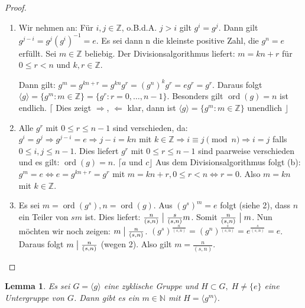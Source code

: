 \documentclass[12pt]{scrartcl} %
\DeclareMathOperator{\ord}{ord}
\newcommand{\divides}{\mathrel{\bigm|}}
\newtheorem{lemma}[thm]{Lemma}
\theoremstyle{definition}
\theoremstyle{remark}
\begin{document}
\begin{proof} %
	\begin{enumerate}
		\item Wir nehmen an: Für $i,j \in \mathbb{Z}$, o.B.d.A. $j>i$ gilt $g^{i}=g^{j}$.
		Dann gilt $g^{j-i}=g^{j}(g^{i})^{-1}=e$.
		Es sei dann n die kleinste positive Zahl, die $g^{n}=e$ erfüllt.
		Sei $m \in \mathbb{Z}$ beliebig.
		Der Divisionsalgorithmus liefert: $m=kn+r$ für $0 \leq r < n$ und $k,r \in \mathbb{Z}$.

		Dann gilt:
		$g^{m}=g^{kn+r}=g^{kn}g^{r}=(g^{n})^{k}g^{r}=eg^{r}=g^{r}$.
		Daraus folgt $\langle g \rangle = \lbrace g^{m} : m \in \mathbb{Z}\rbrace = \lbrace g^{r} : r=0,\dots,n-1\rbrace$.
		Besonders gilt $\ord(g)=n$ ist endlich.
		$\lceil$ Dies zeigt $\Rightarrow$, $\Leftarrow$ klar, dann ist $\langle g \rangle = \lbrace g^{m} : m \in \mathbb{Z}\rbrace$ unendlich $\rfloor$
		\item Alle $g^{r}$ mit $0 \leq r \leq n-1$ sind verschieden, da:
		$g^{i}=g^{j} \Rightarrow g^{j-i}=e \Rightarrow j-i = kn$ mit $k\in\mathbb{Z} \Rightarrow i \equiv j \pmod{n} \Rightarrow i=j$ falls $0\leq i,j\leq n-1$.
		Dies liefert $g^{r}$ mit $0 \leq r \leq n-1$ sind paarweise verschieden und es gilt: $\ord(g)=n$. $\lceil a$ und $c\rfloor$
		Aus dem Divisionsalgorithmus folgt (b): $g^{m}=e \Leftrightarrow e=g^{kn+r}=g^{r}$ mit $m = kn+r, 0 \leq r < n \Leftrightarrow r=0$.
		Also $m=kn$ mit $k \in \mathbb{Z}$. %
		\item Es sei $m=\ord(g^{s}), n =\ord(g)$.
		Aus $(g^{s})^{m}=e$ folgt (siehe 2), dass $n$ ein Teiler von $sm$ ist.
		Dies liefert: $\frac{n}{(s,n)} \divides \frac{s}{(s,n)}m$. Somit $\frac{n}{(s,n)} \divides m$.
		Nun möchten wir noch zeigen: $m \divides \frac{n}{(s,n)}$. $(g^{s})^{\frac{n}{(s,n)}} = (g^{n})^{\frac{s}{(s,n)}}=e^{\frac{s}{(s,n)}}=e$.
		Daraus folgt $m \divides \frac{n}{(s,n)}$ (wegen 2).
		Also gilt $m = \frac{n}{(s,n)}$. \qedhere
	\end{enumerate}
\end{proof}

\begin{lemma}
        Es sei $G = \langle g \rangle$ eine zyklische Gruppe und $H \subset G,\; H\neq\{e\}$ eine Untergruppe von $G$. %
	Dann gibt es ein $m\in\mathbb{N}$ mit $H=\langle g^m\rangle$.
\end{lemma}
\end{document}
